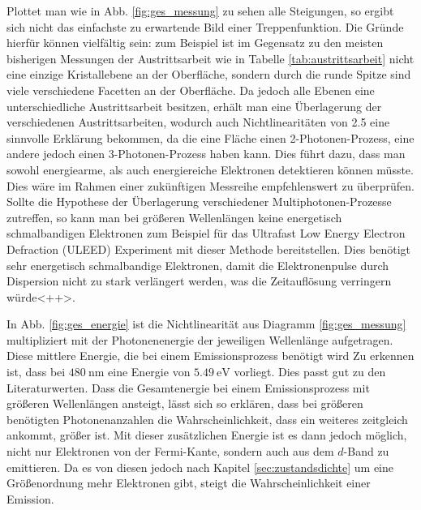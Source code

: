 \documentclass[bachelor,       %
               twoside,        %
               BCOR10mm,       %
               english,ngerman, %
               ]{GAUBM}
\begin{document}
Plottet man wie in Abb. \ref{fig:ges_messung} zu sehen alle Steigungen, so ergibt sich nicht das einfachste zu erwartende Bild einer Treppenfunktion.
Die Gründe hierfür können vielfältig sein: zum Beispiel ist im Gegensatz zu den meisten bisherigen Messungen der Austrittsarbeit wie in Tabelle \ref{tab:austrittsarbeit} nicht eine einzige Kristallebene an der Oberfläche, sondern durch die runde Spitze sind viele verschiedene Facetten an der Oberfläche.
Da jedoch alle Ebenen eine unterschiedliche Austrittsarbeit besitzen, erhält man eine Überlagerung der verschiedenen Austrittsarbeiten, wodurch auch Nichtlinearitäten von 2.5 eine sinnvolle Erklärung bekommen, da die eine Fläche einen 2-Photonen-Prozess, eine andere jedoch einen 3-Photonen-Prozess haben kann.
Dies führt dazu, dass man sowohl energiearme, als auch energiereiche Elektronen detektieren können müsste.
Dies wäre im Rahmen einer zukünftigen Messreihe empfehlenswert zu überprüfen.
Sollte die Hypothese der Überlagerung verschiedener Multiphotonen-Prozesse zutreffen, so kann man bei größeren Wellenlängen keine energetisch schmalbandigen Elektronen zum Beispiel für das Ultrafast Low Energy Electron Defraction (ULEED) Experiment mit dieser Methode bereitstellen.
Dies benötigt sehr energetisch schmalbandige Elektronen, damit die Elektronenpulse durch Dispersion nicht zu stark verlängert werden, was die Zeitauflösung verringern würde<+\cite{uleed}+>.

In Abb. \ref{fig:ges_energie} ist die Nichtlinearität aus Diagramm \ref{fig:ges_messung} multipliziert mit der Photonenenergie der jeweiligen Wellenlänge aufgetragen.
Diese mittlere Energie, die bei einem Emissionsprozess benötigt wird 
Zu erkennen ist, dass bei $\SI{480}{\nano\meter}$ eine Energie von $\SI{5.49}\electronvolt$ vorliegt.
Dies passt gut zu den Literaturwerten.
Dass die Gesamtenergie bei einem Emissionsprozess mit größeren Wellenlängen ansteigt, lässt sich so erklären, dass bei größeren benötigten Photonenanzahlen die Wahrscheinlichkeit, dass ein weiteres zeitgleich ankommt, größer ist.
Mit dieser zusätzlichen Energie ist es dann jedoch möglich, nicht nur Elektronen von der Fermi-Kante, sondern auch aus dem $d$-Band zu emittieren.
Da es von diesen jedoch nach Kapitel \ref{sec:zustandsdichte} um eine Größenordnung mehr Elektronen gibt, steigt die Wahrscheinlichkeit einer Emission.\newline\newline



 
\end{document}

